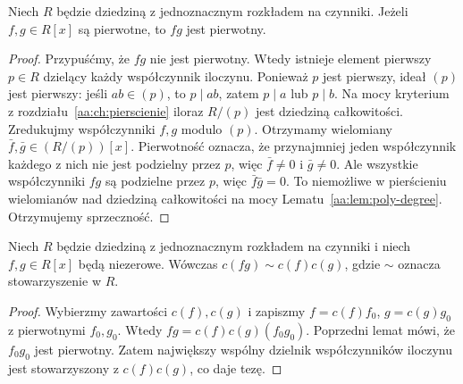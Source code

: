 \begin{lemat}
\label{aa:lem:gauss-primitive}
Niech $R$ będzie dziedziną z jednoznacznym rozkładem
na czynniki. Jeżeli $f,g\in R[x]$ są pierwotne,
to $fg$ jest pierwotny.
\end{lemat}
\begin{proof}
Przypuśćmy, że $fg$ nie jest pierwotny. Wtedy
istnieje element pierwszy $p\in R$ dzielący każdy
współczynnik iloczynu. Ponieważ $p$ jest pierwszy,
ideał $(p)$ jest pierwszy: jeśli $ab\in(p)$, to
$p\mid ab$, zatem $p\mid a$ lub $p\mid b$.
Na mocy kryterium z rozdziału~\ref{aa:ch:pierscienie}
iloraz $R/(p)$ jest dziedziną całkowitości.
Zredukujmy współczynniki $f,g$ modulo $(p)$.
Otrzymamy wielomiany $\bar f,\bar g\in(R/(p))[x]$.
Pierwotność oznacza, że przynajmniej jeden współczynnik
każdego z nich nie jest podzielny przez $p$,
więc $\bar f\ne0$ i $\bar g\ne0$.
Ale wszystkie współczynniki $fg$ są podzielne przez $p$,
więc $\bar f\bar g=0$. To niemożliwe w pierścieniu
wielomianów nad dziedziną całkowitości na mocy
Lematu~\ref{aa:lem:poly-degree}. Otrzymujemy sprzeczność.
\end{proof}

\begin{twierdzenie}
\label{aa:tw:gauss-content}
Niech $R$ będzie dziedziną z jednoznacznym rozkładem
na czynniki i niech $f,g\in R[x]$ będą niezerowe.
Wówczas $c(fg)\sim c(f)c(g)$, gdzie $\sim$ oznacza
stowarzyszenie w $R$.
\end{twierdzenie}
\begin{proof}
Wybierzmy zawartości $c(f),c(g)$ i zapiszmy
$f=c(f)f_0$, $g=c(g)g_0$ z pierwotnymi $f_0,g_0$.
Wtedy $fg=c(f)c(g)(f_0g_0)$.
Poprzedni lemat mówi, że $f_0g_0$ jest pierwotny.
Zatem największy wspólny dzielnik współczynników iloczynu
jest stowarzyszony z $c(f)c(g)$, co daje tezę.
\end{proof}

